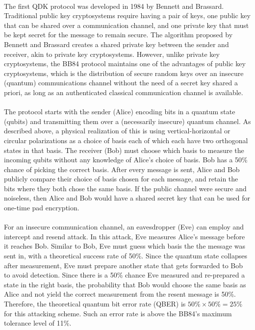 \documentclass[12pt,a4paper]{article}
\begin{document}
	\paragraph{}
	The first QDK protocol was developed in 1984 by Bennett and Brassard. Traditional public key cryptosystems require having a pair of keys, one public key that can be shared over a communication channel, and one private key that must be kept secret for the message to remain secure. The algorithm proposed by Bennett and Brassard creates a shared private key between the sender and receiver, akin to private key cryptosystems. However, unlike private key cryptosystems, the BB84 protocol maintains one of the advantages of public key cryptosystems, which is the distribution of secure random keys over an insecure (quantum) communications channel without the need of a secret key shared a priori, as long as an authenticated classical communication channel is available.

	\paragraph{}
	The protocol starts with the sender (Alice) encoding bits in a quantum state (qubits) and transmitting them over a (necessarily insecure) quantum channel. As described above, a physical realization of this is using vertical-horizontal or circular polarizations as a choice of basis each of which each have two orthogonal states in that basis. The receiver (Bob) must choose which basis to measure the incoming qubits without any knowledge of Alice's choice of basis. Bob has a 50\% chance of picking the correct basis. After every message is sent, Alice and Bob publicly compare their choice of basis chosen for each message, and retain the bits where they both chose the same basis. If the public channel were secure and noiseless, then Alice and Bob would have a shared secret key that can be used for one-time pad encryption.

	\paragraph{}
	For an insecure communication channel, an eavesdropper (Eve) can employ and intercept and resend attack. In this attack, Eve measures Alice's message before it reaches Bob. Similar to Bob, Eve must guess which basis the the message was sent in, with a theoretical success rate of 50\%. Since the quantum state collapses after measurement, Eve must prepare another state that gets forwarded to Bob to avoid detection. Since there is a 50\% chance Eve measured and re-prepared a state in the right basis, the probability that Bob would choose the same basis as Alice and not yield the correct measurement from the resent message is 50\%. Therefore, the theoretical quantum bit error rate (QBER) is $50\% \times 50\% = 25\%$ for this attacking scheme. Such an error rate is above the BB84's maximum tolerance level of 11\%. %
\end{document}
